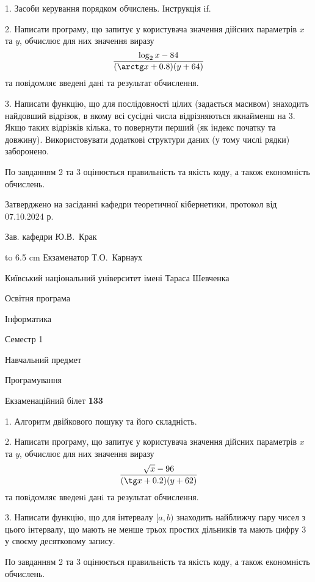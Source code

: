 \documentclass[12pt, ukrainian]{article}
\begin{document}
{%
1. Засоби керування порядком обчислень. Інструкція if.%
\par
2. Написати програму, що запитує у користувача значення дійсних параметрів $x$ та $y$, обчислює для них значення виразу 
$$\frac{\log_{2} x - 84}{(\arctg x + 0.8) (y + 64)}$$ 
та повiдомляє введенi данi та результат обчислення.

\par
3. Написати функцію, що для послідовності цілих (задається масивом) знаходить найдовший відрізок, в якому всі сусідні числа відрізняються якнайменш на 3. Якщо таких відрізків кілька, то повернути перший (як індекс початку та довжину). Використовувати додаткові структури даних (у тому числі рядки) заборонено.

По завданням 2 та 3 оцінюється правильність та якість коду, а також економність обчислень.

}
{\smallskip\smallskip \begin {scriptsize} Затверджено на засіданні кафедри теоретичної кібернетики, протокол   від   07.10.2024 р.\par\smallskip\smallskip\smallskip\smallskip
{\parbox {6.5 cm} {Зав. кафедри \dotfill Ю.В.~Крак}}\hspace {0.7cm} {\hbox to 6.5 cm { Екзаменатор \dotfill Т.О.~Карнаух}} \end{scriptsize}}
\newpage
{{\begin {scriptsize}\par
{ \center  Київський національний університет імені Тараса Шевченка \par}
{\parbox {5 cm}{Освітня програма \hfill}{\parbox {7 cm}{Інформатика\hfill}}\parbox {6 cm}{\hfill Семестр 1}}\par
{\parbox {5 cm} {Навчальний предмет \hfill}\parbox {7 cm}{Програмування \hfill}\parbox {6cm}{\hfill}\par}\vspace{-15pt} \end{scriptsize}}{\center Екзаменаційний білет \No \textbf { 133 }\par}}
{%
1. Алгоритм двійкового пошуку та його складність.%
\par
2. Написати програму, що запитує у користувача значення дійсних параметрів $x$ та $y$, обчислює для них значення виразу 
$$\frac{\sqrt x - 96}{(\tg x + 0.2) (y + 62)}$$ 
та повiдомляє введенi данi та результат обчислення.

\par
3. Написати функцію, що для інтервалу $[a, b)$ знаходить найближчу пару чисел з цього інтервалу, що мають не менше трьох простих дільників та мають цифру 3 у своєму десятковому запису.

По завданням 2 та 3 оцінюється правильність та якість коду, а також економність обчислень.

}
\end{document}
